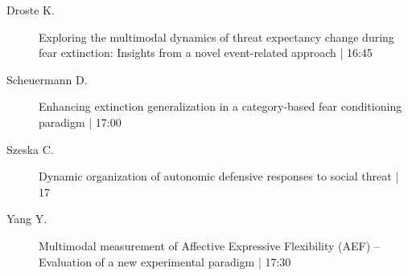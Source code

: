 \begin{symposium}
\begin{description}
                \item [ Droste K.] Exploring the multimodal dynamics of threat expectancy change during fear extinction: Insights from a novel event-related approach \textcolor{mygray}{ | 16:45}    
                
                \item [ Scheuermann D.] Enhancing extinction generalization in a category-based fear conditioning paradigm \textcolor{mygray}{ | 17:00}    
                
                \item [ Szeska C.] Dynamic organization of autonomic defensive responses to social threat \textcolor{mygray}{ | 17}    
                
                \item [ Yang Y.] Multimodal measurement of Affective Expressive Flexibility (AEF) – Evaluation of a new experimental paradigm \textcolor{mygray}{ | 17:30}    
                
            \end{description} 
            \end{symposium}
            